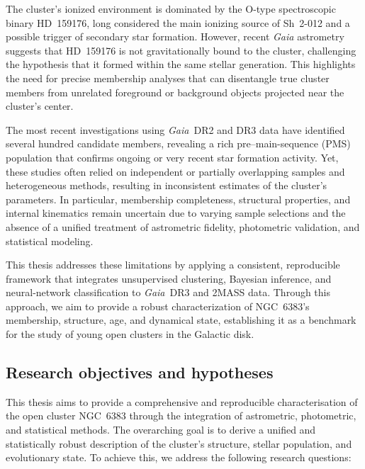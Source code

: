 \documentclass[../main.tex]{subfiles}
\begin{document}
The cluster’s ionized environment is dominated by the O-type spectroscopic binary HD~159176, long considered the main ionizing source of Sh~2-012 and a possible trigger of secondary star formation. However, recent \textit{Gaia} astrometry suggests that HD~159176 is not gravitationally bound to the cluster, challenging the hypothesis that it formed within the same stellar generation. This highlights the need for precise membership analyses that can disentangle true cluster members from unrelated foreground or background objects projected near the cluster’s center.

The most recent investigations using \textit{Gaia}~DR2 and DR3 data have identified several hundred candidate members, revealing a rich pre–main-sequence (PMS) population that confirms ongoing or very recent star formation activity. Yet, these studies often relied on independent or partially overlapping samples and heterogeneous methods, resulting in inconsistent estimates of the cluster’s parameters. In particular, membership completeness, structural properties, and internal kinematics remain uncertain due to varying sample selections and the absence of a unified treatment of astrometric fidelity, photometric validation, and statistical modeling.

This thesis addresses these limitations by applying a consistent, reproducible framework that integrates unsupervised clustering, Bayesian inference, and neural-network classification to \textit{Gaia}~DR3 and 2MASS data. Through this approach, we aim to provide a robust characterization of NGC~6383’s membership, structure, age, and dynamical state, establishing it as a benchmark for the study of young open clusters in the Galactic disk.

\subsection{Research objectives and hypotheses}

This thesis aims to provide a comprehensive and reproducible characterisation of the open cluster NGC~6383 through the integration of astrometric, photometric, and statistical methods. The overarching goal is to derive a unified and statistically robust description of the cluster’s structure, stellar population, and evolutionary state. To achieve this, we address the following research questions:
\end{document}
